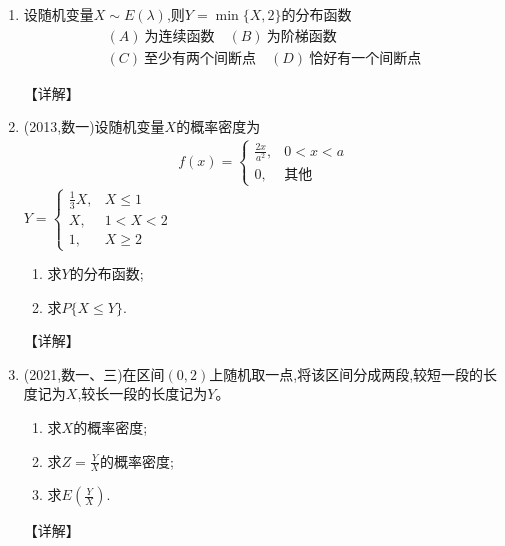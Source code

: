 \documentclass[12pt, a4paper, oneside, UTF8]{ctexbook}
\begin{document}
\begin{enumerate}[label=\arabic*.,start=15]
    \item  设随机变量$X\sim E(\lambda)$,则$Y=\min\{X,2\}$的分布函数
    \begin{align*}
        (A)\ 为连续函数 \quad (B)\ 为阶梯函数 \\
        (C)\ 至少有两个间断点 \quad (D)\ 恰好有一个间断点
    \end{align*}
    
    \begin{solution}
    【详解】
    \end{solution}
    
    \item  (2013,数一)设随机变量$X$的概率密度为
    \begin{align*}
        f(x)=\begin{cases}
            \frac{2x}{a^2}, & 0<x<a \\
            0, & \text{其他}
        \end{cases}
    \end{align*}
    $Y=\begin{cases}
        \frac{1}{3}X, & X\leq 1 \\
        X, & 1<X<2 \\
        1, & X\geq 2
    \end{cases}$
    \begin{enumerate}
        \item 求$Y$的分布函数;
        \item 求$P\{X\leq Y\}$.
    \end{enumerate}
    
    \begin{solution}
    【详解】
    \end{solution}
    
    \item  (2021,数一、三)在区间$(0,2)$上随机取一点,将该区间分成两段,较短一段的长度记为$X$,较长一段的长度记为$Y$。
    \begin{enumerate}
        \item 求$X$的概率密度;
        \item 求$Z=\frac{Y}{X}$的概率密度;
        \item 求$E\left(\frac{Y}{X}\right)$.
    \end{enumerate}
    
    \begin{solution}
    【详解】
    \end{solution}
\end{enumerate}

\ifx\allfiles\undefined
\end{document}
